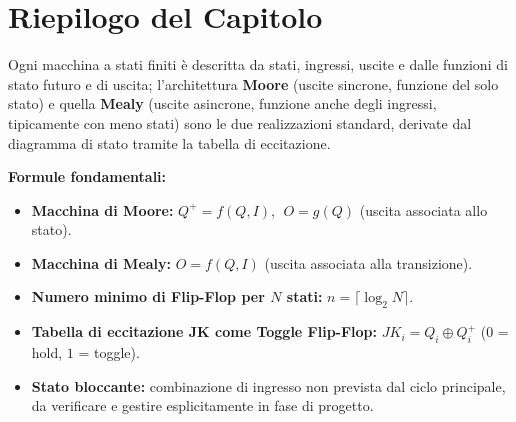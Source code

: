 \section*{Riepilogo del Capitolo}

\begin{important}
Ogni macchina a stati finiti è descritta da stati, ingressi, uscite e dalle funzioni di stato futuro e di uscita; l'architettura \textbf{Moore} (uscite sincrone, funzione del solo stato) e quella \textbf{Mealy} (uscite asincrone, funzione anche degli ingressi, tipicamente con meno stati) sono le due realizzazioni standard, derivate dal diagramma di stato tramite la tabella di eccitazione.
\end{important}

\begin{note}
\textbf{Formule fondamentali:}
\begin{itemize}
    \item \textbf{Macchina di Moore:} $Q^+=f(Q,I)$, $\; O=g(Q)$ (uscita associata allo stato).
    \item \textbf{Macchina di Mealy:} $O=f(Q,I)$ (uscita associata alla transizione).
    \item \textbf{Numero minimo di Flip-Flop per $N$ stati:} $n = \lceil \log_2 N \rceil$.
    \item \textbf{Tabella di eccitazione JK come Toggle Flip-Flop:} $JK_i = Q_i \oplus Q_i^+$ ($0$ = hold, $1$ = toggle).
    \item \textbf{Stato bloccante:} combinazione di ingresso non prevista dal ciclo principale, da verificare e gestire esplicitamente in fase di progetto.
\end{itemize}
\end{note}

